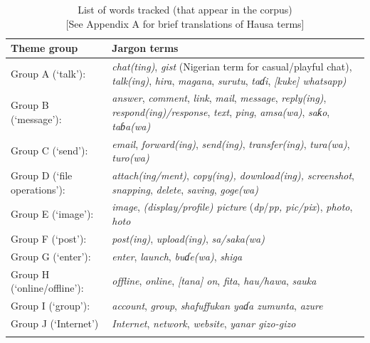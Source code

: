 \documentclass[output=paper
,newtxmath
,modfonts
,nonflat]{langsci/langscibook}
\begin{document}
\begin{table}
\begin{tabularx}{\textwidth}{lQ}
\lsptoprule
{ Theme group} &  Jargon terms\\
\midrule
Group A (‘talk’): & {\textit{chat(ting)}, \textit{gist} (Nigerian  term for casual/playful chat), \textit{talk(ing)}, \textit{hira}, \textit{magana}, \textit{surutu}, \textit{taɗi}, \textit{[kuke] whatsapp)}}\\
Group B (‘message’): & {\textit{answer}, \textit{comment}, \textit{link}, \textit{mail}, \textit{message}, \textit{reply(ing)}, \textit{respond(ing)/response}, \textit{text}, \textit{ping}, \textit{amsa(wa)}, \textit{saƙo}, \textit{taɓa(wa)}}\\
Group C (‘send’): & {\textit{email}, \textit{forward(ing)}, \textit{send(ing)}, \textit{transfer(ing)}, \textit{tura(wa)}, \textit{turo(wa)}}\\
Group D (‘file operations’): & {\textit{attach(ing/ment)}, \textit{copy(ing), download(ing), screenshot}, \textit{snapping}, \textit{delete}, \textit{saving}, \textit{goge(wa)}}\\
Group E (‘image’): & {\textit{image}, \textit{(display/profile) picture} (\textit{dp}/\textit{pp, pic/pix}), \textit{photo}, \textit{hoto}}\\
Group F (‘post’): & {\textit{post(ing)}, \textit{upload(ing)}, \textit{sa/saka(wa)}}\\
Group G (‘enter’): & {\textit{enter}, \textit{launch}, \textit{buɗe(wa)}, \textit{shiga}}\\
Group H (‘online/offline’): & {\textit{offline}, \textit{online}, \textit{[tana] on}, \textit{fita}, \textit{hau/hawa}, \textit{sauka}}\\
Group I (‘group’): & {\textit{account}, \textit{group}, \textit{shafuffukan yaɗa zumunta}, \textit{azure}}\\
Group J (‘Internet’) & {\textit{Internet}, \textit{network}, \textit{website}, \textit{yanar gizo-gizo}}\\
\lspbottomrule
\end{tabularx} 
\caption{List of words tracked (that appear in the corpus)\\{}[See Appendix A for brief translations of Hausa terms]}
\label{tab:purvis:2}
\end{table} 
 
\end{document}
